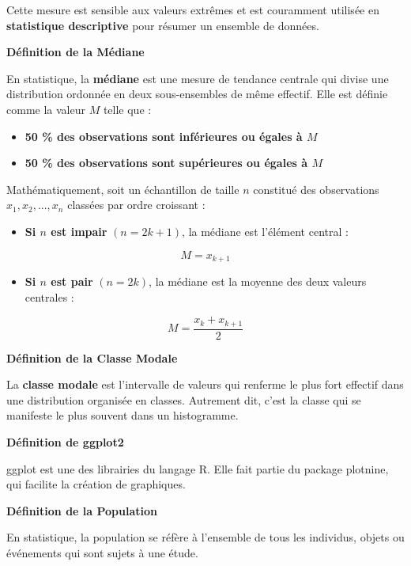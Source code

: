\documentclass[
]{article}
\providecommand{\tightlist}{%
  \setlength{\itemsep}{0pt}\setlength{\parskip}{0pt}}
\begin{document}
Cette mesure est sensible aux valeurs extrêmes et est couramment
utilisée en \textbf{statistique descriptive} pour résumer un ensemble de
données.

\textbf{Définition de la Médiane}

En statistique, la \textbf{médiane} est une mesure de tendance centrale
qui divise une distribution ordonnée en deux sous-ensembles de même
effectif. Elle est définie comme la valeur \(M\) telle que :

\begin{itemize}
\tightlist
\item
  \textbf{50 \% des observations sont inférieures ou égales à \(M\)}\\
\item
  \textbf{50 \% des observations sont supérieures ou égales à \(M\)}
\end{itemize}

Mathématiquement, soit un échantillon de taille \(n\) constitué des
observations \textbf{\(x_1, x_2, ..., x_n\)} classées par ordre
croissant :

\begin{itemize}
\tightlist
\item
  \textbf{Si \(n\) est impair} \((n = 2k + 1)\), la médiane est
  l'élément central :
\end{itemize}

\[
M = x_{k+1}
\]

\begin{itemize}
\tightlist
\item
  \textbf{Si \(n\) est pair} \((n = 2k)\), la médiane est la moyenne des
  deux valeurs centrales :
\end{itemize}

\[
M = \frac{x_k + x_{k+1}}{2}
\]

\textbf{Définition de la Classe Modale}

La \textbf{classe modale} est l'intervalle de valeurs qui renferme le
plus fort effectif dans une distribution organisée en classes. Autrement
dit, c'est la classe qui se manifeste le plus souvent dans un
histogramme.

\textbf{Définition de ggplot2}

ggplot est une des librairies du langage R. Elle fait partie du package
plotnine, qui facilite la création de graphiques.

\textbf{Définition de la Population}

En statistique, la population se réfère à l'ensemble de tous les
individus, objets ou événements qui sont sujets à une étude.
\end{document}
